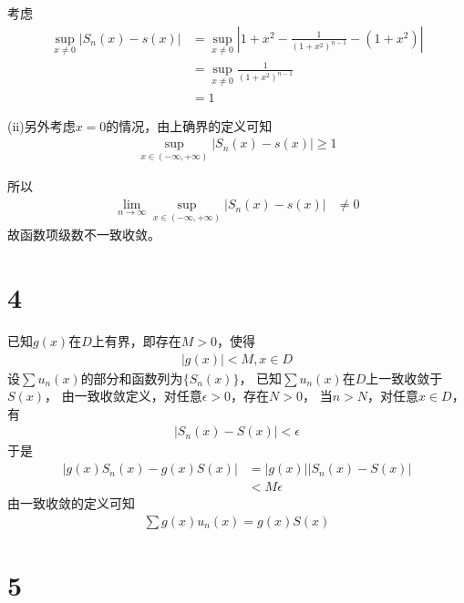 \documentclass{article}
\begin{document}
\begin{itemize}
        考虑
        \begin{align*}
          \sup\limits_{x \neq 0} |S_n(x) - s(x)|
           & = \sup\limits_{x \neq 0} \left|1 + x^2 - \frac{1}{(1 + x^2)^{n - 1}} - (1 + x^2) \right| \\
           & = \sup\limits_{x \neq 0} \frac{1}{(1 + x^2)^{n - 1}}                                     \\
           & = 1
        \end{align*}

        (ii)另外考虑$x = 0$的情况，由上确界的定义可知
        \begin{align*}
          \sup\limits_{x \in (-\infty, +\infty)} |S_n(x) - s(x)| \geq 1
        \end{align*}

        所以
        \begin{align*}
          \lim\limits_{n \to \infty} \sup\limits_{x \in (-\infty, +\infty)} |S_n(x) - s(x)|
           & \neq 0
        \end{align*}
        故函数项级数不一致收敛。

\end{itemize}

\section*{4}

已知$g(x)$在$D$上有界，即存在$M > 0$，使得
\begin{align*}
  |g(x)| < M, x \in D
\end{align*}
设$\sum u_n(x)$的部分和函数列为$\{S_n(x)\}$，
已知$\sum u_n(x)$在$D$上一致收敛于$S(x)$，
由一致收敛定义，对任意$\epsilon > 0$，存在$N > 0$，
当$n > N$，对任意$x \in D$，有
\begin{align*}
  |S_n(x) - S(x)| < \epsilon
\end{align*}
于是
\begin{align*}
  |g(x) S_n(x) - g(x) S(x)|
   & = |g(x)| |S_n(x) - S(x)| \\
   & < M \epsilon
\end{align*}
由一致收敛的定义可知
\begin{align*}
  \sum g(x) u_n(x) = g(x) S(x)
\end{align*}

\section*{5}
\end{document}
